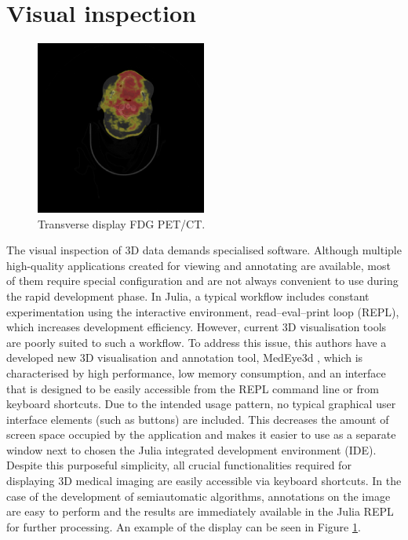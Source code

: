 \documentclass{juliacon}
\begin{document}
\section{Visual inspection}

\begin{figure}[t!]
	\centering
	\includegraphics[width=0.5\textwidth]{PETCTCORONAL.png}
	\caption{Transverse display FDG PET/CT.}
	\label{fig:PETCTCORONAL}
	\centering
\end{figure}

The visual inspection of 3D data demands specialised software. Although multiple high-quality applications created for viewing and annotating are available, most of them require special configuration and are not always convenient to use during the rapid development phase. In Julia, a typical workflow includes constant experimentation using the interactive environment, read--eval--print loop (REPL), which increases development efficiency. However, current 3D visualisation tools are poorly suited to such a workflow. To address this issue, this authors have a developed new 3D visualisation and annotation tool, MedEye3d \cite{Mitura2021}, which is characterised by high performance, low memory consumption, and an interface that is designed to be easily accessible from the REPL command line or from keyboard shortcuts. Due to the intended usage pattern, no typical graphical user interface elements (such as buttons)  are included. This decreases the amount of screen space occupied by the application and makes it easier to use  as a separate window next to chosen the Julia integrated development environment (IDE). Despite this purposeful simplicity, all crucial functionalities required for displaying 3D medical imaging are easily accessible via keyboard shortcuts. In the case of the development of semiautomatic algorithms, annotations on the image are easy to perform and the results are immediately available in the Julia REPL for further processing. An example of the display can be seen in Figure \ref{fig:PETCTCORONAL}.
\end{document}
